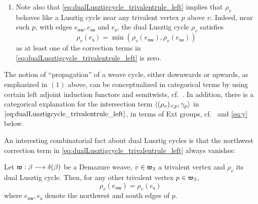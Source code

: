 \begin{enumerate}
\noindent In the last equality we used that $a=[a]_+-[-a]_+$, where we denote $[a]_+:=\max(a,0)$. The identity \eqref{eq:duality} partially justifies the adjective {\it dual} for dual Lusztig cycles.\\

    \item Note also that \eqref{eq:dualLusztigcycle_trivalentrule_left} implies that $\rho_v$ behaves like a Lusztig cycle near any trivalent vertex $p$ above $v$. Indeed, near such $p$, with edges $e_\mathsf{nw},e_\mathsf{ne}$ and $e_\mathsf{s}$, the dual Lusztig cycle $\rho_v$ satisfies
     $$\rho_v(e_\mathsf{s})=\min(\rho_v(e_\mathsf{nw}), \rho_v(e_\mathsf{ne}))$$
     as at least one of the correction terms in \eqref{eq:dualLusztigcycle_trivalentrule_left} is zero.
\end{enumerate}

\begin{remark}
The notion of ``propagation'' of a weave cycle, either downwards or upwards, as emphasized in $(1)$ above, can be conceptualized in categorical terms by using certain left adjoint induction functors and semitwists, cf.~\cite[Sections 7.3 \& 9.4]{CasalsChrist}. In addition, there is a categorical explanation for the intersection term $\langle (\rho_v)_{<p},\gamma_p\rangle$ in $\eqref{eq:dualLusztigcycle_trivalentrule_left}$, in terms of Ext groups, cf.~\cite[Section 9.3]{CasalsChrist} and \eqref{eq:y} below.\sbs
\end{remark}

\noindent An interesting combinatorial fact about dual Lusztig cycles is that the northwest correction term in \eqref{eq:dualLusztigcycle_trivalentrule_left} always vanishes:

\begin{proposition}\label{prop:rightveering} Let $\mathfrak{w}:\beta\longrightarrow\delta(\beta)$ be a Demazure weave, $v\in\mathfrak{w}_3$ a trivalent vertex and $\rho_v$ its dual Lusztig cycle. Then, for any other trivalent vertex $p\in\mathfrak{w}_3$, 
$$\rho_v(e_{\mathsf{nw}})=\rho_v(e_{\mathsf{s}})$$
where $e_{\mathsf{nw}},e_{\mathsf{s}}$ denote the northwest and south edges of $p$.\sbs
\end{proposition}

